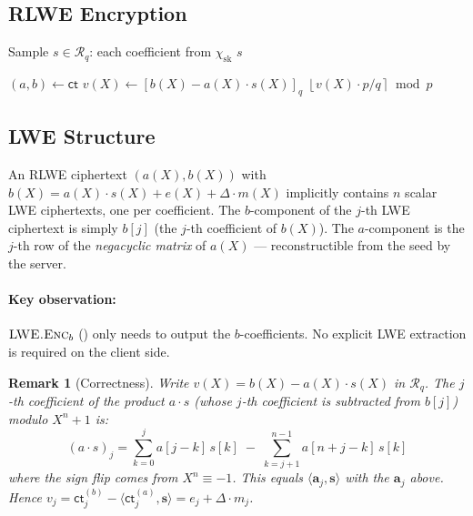 \documentclass[11pt,a4paper]{article}
\newcommand{\R}{\mathcal{R}}
\newcommand{\Rq}{\R_{q}}
\newcommand{\round}[1]{\left\lfloor #1 \right\rceil}
\newcommand{\inner}[2]{\langle #1, #2 \rangle}
\newtheorem{remark}{Remark}
\begin{document}
\subsection{RLWE Encryption}\label{sec:rlwe}

\begin{algorithm}[H]
\caption{$\textsc{SKGen}()$}
\label{alg:skgen}
\begin{algorithmic}[1]
\State Sample $s \in \Rq$: each coefficient from $\chi_{\mathrm{sk}}$
\State \Return $s$
\end{algorithmic}
\end{algorithm}

\begin{algorithm}[H]
\caption{$\textsc{RLWE.Dec}(s, \mathsf{ct})$: Decrypt.}
\label{alg:dec}
\begin{algorithmic}[1]
\State $(a, b) \gets \mathsf{ct}$
\State $v(X) \gets [b(X) - a(X) \cdot s(X)]_q$ 
\State \Return $\round{v(X) \cdot p / q} \bmod p$ 
\end{algorithmic}
\end{algorithm}

\subsection{LWE Structure}\label{sec:lwe-extract}

An RLWE ciphertext $(a(X), b(X))$ with $b(X) = a(X) \cdot s(X) + e(X) + \Delta \cdot m(X)$ implicitly contains $n$ scalar LWE ciphertexts, one per coefficient.
The $b$-component of the $j$-th LWE ciphertext is simply $b[j]$ (the $j$-th coefficient of $b(X)$).
The $a$-component is the $j$-th row of the \emph{negacyclic matrix} of $a(X)$ --- reconstructible from the seed by the server.

\paragraph{Key observation:} $\textsc{LWE.Enc}_b$ () only needs to output the $b$-coefficients.
No explicit LWE extraction is required on the client side.

\begin{remark}[Correctness]\label{rem:extract}
Write $v(X) = b(X) - a(X) \cdot s(X)$ in $\Rq$.
The $j$-th coefficient of the product $a \cdot s$ (whose $j$-th coefficient is subtracted from $b[j]$) modulo $X^n+1$ is:
\begin{equation}
    (a \cdot s)_j = \sum_{k=0}^{j} a[j\!-\!k]\, s[k] \;-\; \sum_{k=j+1}^{n-1} a[n\!+\!j\!-\!k]\, s[k]
    \label{eq:negacyclic-coeff}
\end{equation}
where the sign flip comes from $X^n \equiv -1$.
This equals $\inner{\mathbf{a}_j}{\mathbf{s}}$ with the $\mathbf{a}_j$ above.
Hence $v_j = \mathsf{ct}^{(b)}_j - \inner{\mathsf{ct}^{(a)}_j}{\mathbf{s}} = e_j + \Delta \cdot m_j$.
\end{remark}
\end{document}
